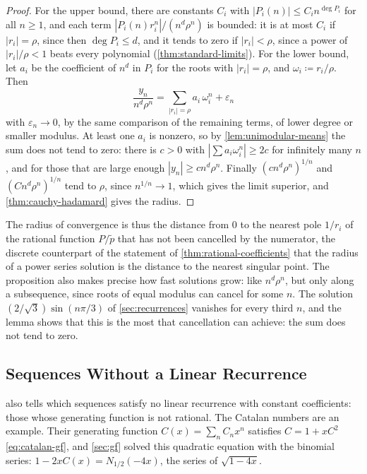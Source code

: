 \begin{proof}
For the upper bound, there are constants $C_i$ with $|P_i(n)|\le C_in^{\deg P_i}$ for all $n\ge1$, and each term $|P_i(n)r_i^n|/(n^d\rho^n)$ is bounded: it is at most $C_i$ if $|r_i|=\rho$, since then $\deg P_i\le d$, and it tends to zero if $|r_i|<\rho$, since a power of $|r_i|/\rho<1$ beats every polynomial (\cref{thm:standard-limits}). For the lower bound, let $a_i$ be the coefficient of $n^d$ in $P_i$ for the roots with $|r_i|=\rho$, and $\omega_i\coloneqq r_i/\rho$. Then
\[
\frac{y_n}{n^d\rho^n}=\sum_{|r_i|=\rho}a_i\,\omega_i^n+\varepsilon_n
\]
with $\varepsilon_n\to0$, by the same comparison of the remaining terms, of lower degree or smaller modulus. At least one $a_i$ is nonzero, so by \cref{lem:unimodular-means} the sum does not tend to zero: there is $c>0$ with $|\sum a_i\omega_i^n|\ge2c$ for infinitely many $n$, and for those that are large enough $|y_n|\ge cn^d\rho^n$. Finally $(cn^d\rho^n)^{1/n}$ and $(Cn^d\rho^n)^{1/n}$ tend to $\rho$, since $n^{1/n}\to1$, which gives the limit superior, and \cref{thm:cauchy-hadamard} gives the radius.
\end{proof}

The radius of convergence is thus the distance from $0$ to the nearest pole $1/r_i$ of the rational function $P/\tilde p$ that has not been cancelled by the numerator, the discrete counterpart of the statement of \cref{thm:rational-coefficients} that the radius of a power series solution is the distance to the nearest singular point. The proposition also makes precise how fast solutions grow: like $n^d\rho^n$, but only along a subsequence, since roots of equal modulus can cancel for some $n$. The solution $(2/\sqrt3)\sin(n\pi/3)$ of \cref{sec:recurrences} vanishes for every third $n$, and the lemma shows that this is the most that cancellation can achieve: the sum does not tend to zero.

\subsection{Sequences Without a Linear Recurrence}

 also tells which sequences satisfy no linear recurrence with constant coefficients: those whose generating function is not rational. The Catalan numbers are an example. Their generating function $C(x)=\sum_nC_nx^n$ satisfies $C=1+xC^2$ \eqref{eq:catalan-gf}, and \cref{sec:gf} solved this quadratic equation with the binomial series: $1-2xC(x)=N_{1/2}(-4x)$, the series of $\sqrt{1-4x}$.

